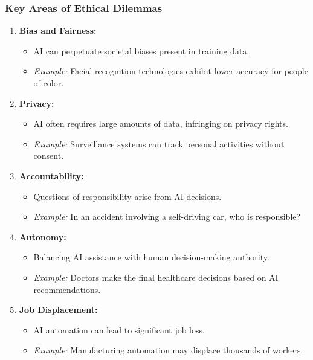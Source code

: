 \documentclass[aspectratio=169]{beamer}
\begin{document}
\begin{frame}[fragile]
    \frametitle{Key Areas of Ethical Dilemmas}
    \begin{enumerate}
        \item \textbf{Bias and Fairness:}
            \begin{itemize}
                \item AI can perpetuate societal biases present in training data.
                \item \textit{Example:} Facial recognition technologies exhibit lower accuracy for people of color.
            \end{itemize}

        \item \textbf{Privacy:}
            \begin{itemize}
                \item AI often requires large amounts of data, infringing on privacy rights.
                \item \textit{Example:} Surveillance systems can track personal activities without consent.
            \end{itemize}

        \item \textbf{Accountability:}
            \begin{itemize}
                \item Questions of responsibility arise from AI decisions.
                \item \textit{Example:} In an accident involving a self-driving car, who is responsible?
            \end{itemize}

        \item \textbf{Autonomy:}
            \begin{itemize}
                \item Balancing AI assistance with human decision-making authority.
                \item \textit{Example:} Doctors make the final healthcare decisions based on AI recommendations.
            \end{itemize}

        \item \textbf{Job Displacement:}
            \begin{itemize}
                \item AI automation can lead to significant job loss.
                \item \textit{Example:} Manufacturing automation may displace thousands of workers.
            \end{itemize}
    \end{enumerate}
\end{frame}
\end{document}
